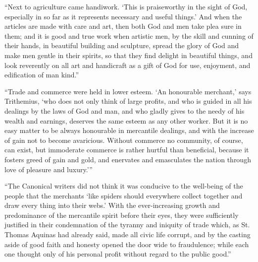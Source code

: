 \documentclass{book}
\begin{document}
“Next to agriculture came handiwork. ‘This is praiseworthy in the sight of God, especially in so far as it represents necessary and useful things.’ And when the articles are made with care and art, then both God and men take plea sure in them; and it is good and true work when artistic men, by the skill and cunning of their hands, in beautiful building and sculpture, spread the glory of God and make men gentle in their spirits, so that they find delight in beautiful things, and look reverently on all art and handicraft as a gift of God for use, enjoyment, and edification of man kind.”

“Trade and commerce were held in lower esteem. ‘An honourable merchant,’ says Trithemius, ‘who does not only think of large profits, and who is guided in all his dealings by the laws of God and man, and who gladly gives to the needy of his wealth and earnings, deserves the same esteem as any other worker. But it is no easy matter to be always honourable in mercantile dealings, and with the increase of gain not to become avaricious. Without commerce no community, of course, can exist, but immoderate commerce is rather hurtful than beneficial, because it fosters greed of gain and gold, and enervates and emasculates the nation through love of pleasure and luxury.’”

“The Canonical writers did not think it was conducive to the well-being of the people that the merchants ‘like spiders should everywhere collect together and draw every thing into their webs.’ With the ever-increasing growth and predominance of the mercantile spirit before their eyes, they were sufficiently justified in their condemnation of the tyranny and iniquity of trade which, as St. Thomas Aquinas had already said, made all civic life corrupt, and by the casting aside of good faith and honesty opened the door wide to fraudulence; while each one thought only of his personal profit without regard to the public good.”\footnotemark[1]
\end{document}
